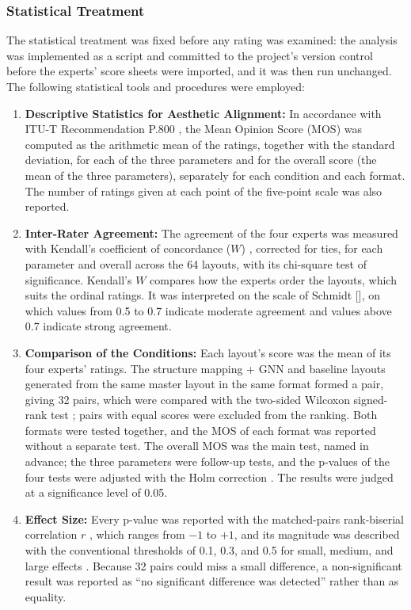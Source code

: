\begin{refsection}
\subsubsection{Statistical Treatment}
The statistical treatment was fixed before any rating was examined: the analysis was implemented as a script and committed to the project's version control before the experts' score sheets were imported, and it was then run unchanged. The following statistical tools and procedures were employed:
\begin{enumerate}
    \item \textbf{Descriptive Statistics for Aesthetic Alignment:} In accordance with ITU-T Recommendation P.800 \cite{itut1996p800}, the Mean Opinion Score (MOS) was computed as the arithmetic mean of the ratings, together with the standard deviation, for each of the three parameters and for the overall score (the mean of the three parameters), separately for each condition and each format. The number of ratings given at each point of the five-point scale was also reported.
    \item \textbf{Inter-Rater Agreement:} The agreement of the four experts was measured with Kendall's coefficient of concordance ($W$) \cite{kendall1939problem}, corrected for ties, for each parameter and overall across the 64 layouts, with its chi-square test of significance. Kendall's $W$ compares how the experts order the layouts, which suits the ordinal ratings. It was interpreted on the scale of Schmidt [\citeyear{schmidt1997managing}], on which values from 0.5 to 0.7 indicate moderate agreement and values above 0.7 indicate strong agreement.
    \item \textbf{Comparison of the Conditions:} Each layout's score was the mean of its four experts' ratings. The structure mapping + GNN and baseline layouts generated from the same master layout in the same format formed a pair, giving 32 pairs, which were compared with the two-sided Wilcoxon signed-rank test \cite{wilcoxon1945individual}; pairs with equal scores were excluded from the ranking. Both formats were tested together, and the MOS of each format was reported without a separate test. The overall MOS was the main test, named in advance; the three parameters were follow-up tests, and the p-values of the four tests were adjusted with the Holm correction \cite{holm1979simple}. The results were judged at a significance level of 0.05.
    \item \textbf{Effect Size:} Every p-value was reported with the matched-pairs rank-biserial correlation $r$ \cite{kerby2014simple}, which ranges from $-1$ to $+1$, and its magnitude was described with the conventional thresholds of 0.1, 0.3, and 0.5 for small, medium, and large effects \cite{cohen1988statistical}. Because 32 pairs could miss a small difference, a non-significant result was reported as ``no significant difference was detected'' rather than as equality.

\end{enumerate}
\end{refsection}

